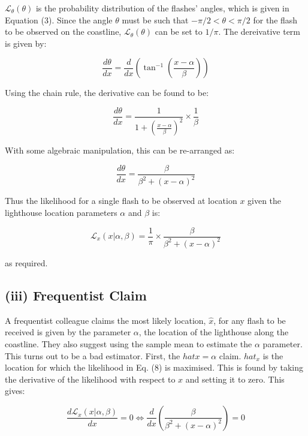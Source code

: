 \documentclass[12pt]{report} %
\begin{document}
$\mathcal{L}_{\theta}(\theta)$ is the probability distribution of the flashes' angles, which is given in Equation (3). Since the angle $\theta$ must be such that $-\pi/2 < \theta < \pi/2$ for the flash to be observed on the coastline, $\mathcal{L}_{\theta}(\theta)$ can be set to $1/\pi$. The dereivative term is given by:

\begin{equation}
    \frac{d\theta}{dx} = \frac{d}{dx} (\tan^{-1}\left(\frac{x - \alpha}{\beta}\right) )
\end{equation}

Using the chain rule, the derivative can be found to be:

\begin{equation}
    \frac{d\theta}{dx} = \frac{1}{1 + \left(\frac{x - \alpha}{\beta}\right)^{2}} \times \frac{1}{\beta}
\end{equation}

With some algebraic manipulation, this can be re-arranged as:

\begin{equation}
    \frac{d\theta}{dx} = \frac{\beta}{\beta^{2} + (x - \alpha)^{2}}
\end{equation}

Thus the likelihood for a single flash to be observed at location $x$ given the lighthouse location parameters $\alpha$ and $\beta$ is:

\begin{equation}
    \mathcal{L}_{x}(x|\alpha, \beta) = \frac{1}{\pi} \times \frac{\beta}{\beta^{2} + (x - \alpha)^{2}} 
\end{equation}

as required.

\subsection*{(iii) Frequentist Claim}

A frequentist colleague claims the most likely location, $\hat{x}$, for any flash to be received is given by the parameter $\alpha$, the location of the lighthouse along the coastline. They also suggest using the sample mean to estimate the $\alpha$ parameter. This turns out to be a bad estimator. First, the $hat{x} = \alpha$ claim. $hat_{x}$ is the location for which the likelihood in Eq. (8) is maximised. This is found by taking the derivative of the likelihood with respect to $x$ and setting it to zero. This gives:

\begin{equation}
    \frac{d\mathcal{L}_{x}(x|\alpha, \beta)}{dx} = 0 \iff \frac{d}{dx} \left(\frac{\beta}{\beta^{2} + (x - \alpha)^{2}}\right) = 0
\end{equation}
\end{document}
